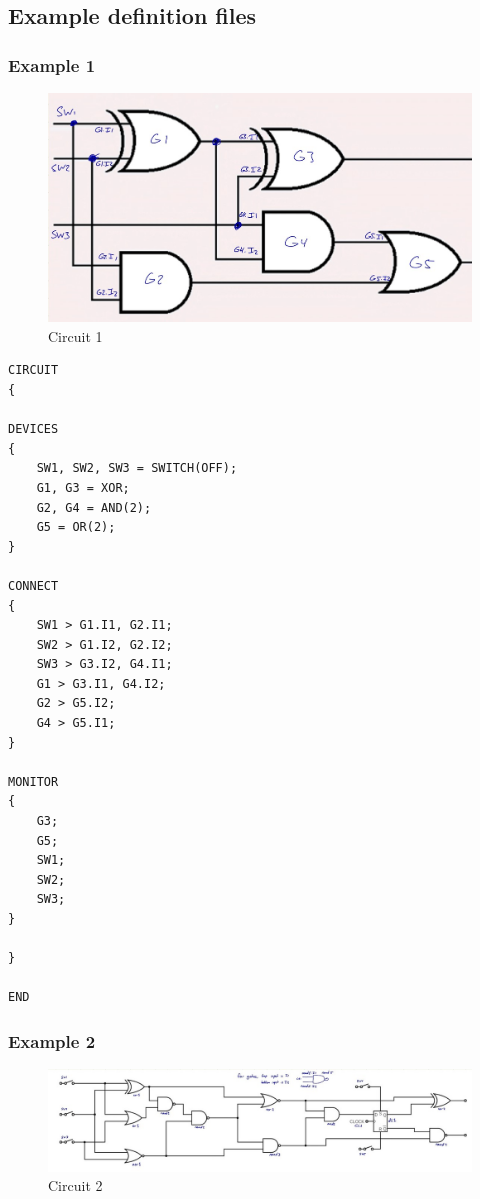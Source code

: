 \documentclass[10pt]{article}
\begin{document}
\newpage
\subsection{Example definition files}

\subsubsection{Example 1}

\begin{figure}[H]
\centering
\captionsetup{justification = centering}
  \includegraphics[width=0.5\linewidth]{Example2CircuitDiagram.jpg}
  \caption{Circuit 1}
\end{figure}

\begin{verbatim}
CIRCUIT
{

DEVICES
{
    SW1, SW2, SW3 = SWITCH(OFF);
    G1, G3 = XOR;
    G2, G4 = AND(2);
    G5 = OR(2);
}

CONNECT
{
    SW1 > G1.I1, G2.I1;
    SW2 > G1.I2, G2.I2;
    SW3 > G3.I2, G4.I1;
    G1 > G3.I1, G4.I2;
    G2 > G5.I2;
    G4 > G5.I1;
}

MONITOR
{
    G3;
    G5;
    SW1;
    SW2;
    SW3;
}

}

END
\end{verbatim}

\newpage
\subsubsection{Example 2}

\begin{figure}[H]
\centering
\captionsetup{justification = centering}
  \includegraphics[width=\linewidth]{Example3CircuitDiagram.jpg}
  \caption{Circuit 2}
\end{figure}
\end{document}
